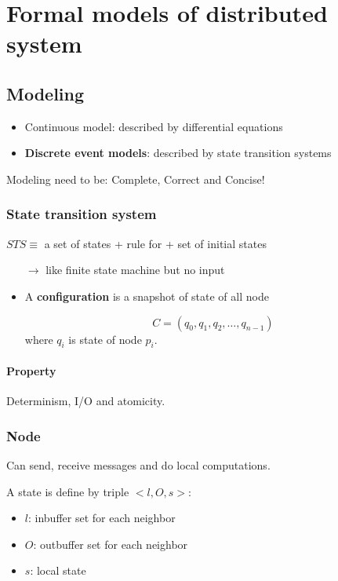 \section{Formal models of distributed system}

\subsection{Modeling}

\begin{itemize}
    \item Continuous model: described by differential equations
    \item \textbf{Discrete event models}: described by state transition systems
\end{itemize}

Modeling need to be: Complete, Correct and Concise!

\subsubsection{State transition system}
$STS \equiv$ a set of states + rule for
+ set of initial states

\begin{enumerate}
    \item[$\to$] like finite state machine but no input
\end{enumerate}

\begin{itemize}
    \item A \textbf{configuration} is a snapshot of state of all node

        $$ C =(q_0, q_1, q_2,\ldots, q_{n-1}) $$  where $q_i$ is state of node $p_i$.
\end{itemize}

\paragraph{Property}
Determinism, I/O and atomicity.

\subsubsection{Node}
Can send, receive messages and do local computations.

A state is define by triple $<l, O, s>$:
\begin{itemize}
    \item $l$: inbuffer set for each neighbor
    \item $O$: outbuffer set for each neighbor
    \item $s$: local state
\end{itemize}

